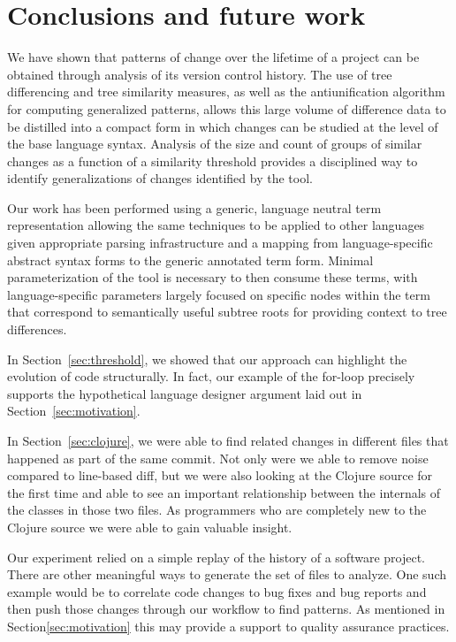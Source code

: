 \section{Conclusions and future work}

We have shown that patterns of change over the lifetime of a project can be
obtained through analysis of its version control history.  The use of tree
differencing and tree similarity measures, as well as the antiunification
algorithm for computing generalized patterns, allows this large volume of
difference data to be distilled into a compact form in which changes can be
studied at the level of the base language syntax.  Analysis of the size and
count of groups of similar changes as a function of a similarity threshold
provides a disciplined way to identify generalizations of changes identified by
the tool.

Our work has been performed using a generic, language neutral term
representation allowing the same techniques to be applied to other languages
given appropriate parsing infrastructure and a mapping from language-specific
abstract syntax forms to the generic annotated term form.  Minimal
parameterization of the tool is necessary to then consume these terms, with
language-specific parameters largely focused on specific nodes within the term
that correspond to semantically useful subtree roots for providing context to
tree differences.

In Section~\ref{sec:threshold}, we showed that our approach can highlight the
evolution of code structurally. In fact, our example of the for-loop precisely
supports the hypothetical language designer argument laid out in
Section~\ref{sec:motivation}.

In Section~\ref{sec:clojure}, we were able to find related changes in different
files that happened as part of the same commit. Not only were we able to remove
noise compared to line-based diff, but we were also looking at the Clojure
source for the first time and able to see an important relationship between the
internals of the classes in those two files. As programmers who are completely
new to the Clojure source we were able to gain valuable insight.


Our experiment relied on a simple replay of the history of a software project.
There are other meaningful ways to generate the set of files to analyze. One
such example would be to correlate code changes to bug fixes and bug reports
and then push those changes through our workflow to find patterns.  As
mentioned in Section\ref{sec:motivation} this may provide a support to quality
assurance practices.

